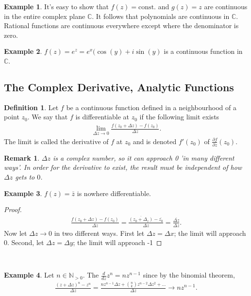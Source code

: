 \documentclass[12pt, a4paper]{article}
\theoremstyle{plain}
\newtheorem{rem}{Remark}
\theoremstyle{definition}
\newtheorem{definition}{Definition} %
\newtheorem{example}{Example} %
\begin{document}
			\begin{example}
				It's easy to show that $f(z)=\mathrm{const.}$ and $g(z)=z$ are continuous in the entire complex plane $\mathbb{C}$. It follows that polynomials are continuous in $\mathbb{C}$. Rational functions are continuous everywhere except where the denominator is zero.\\
			\end{example}

			\begin{example}
				$f(z) = e^z = e^x(\cos(y)+i\sin(y)$ is a continuous function in $\mathbb{C}$.\\
			\end{example}
		\subsection{The Complex Derivative, Analytic Functions} %
		\label{sub:the_complex_derivative_analytic_functions}
			\begin{definition}
				Let $f$ be a continuous function defined in a neighbourhood of a point $z_0$. We say that $f$ is differentiable at $z_0$ if the following limit exists
				\begin{align*}
					\lim\limits_{\Delta z\to 0}\frac{f(z_0+\Delta z)-f(z_0)}{\Delta z}.
				\end{align*}
				The limit is called the derivative of $f$ at $z_0$ and is denoted $f'(z_0)$ of $\frac{\partial f}{\partial z}(z_0)$.\\
			\end{definition}
			\begin{rem}
				$\Delta z$ is a complex number, so it can approach 0 'in many different ways'. In order for the derivative to exist, the result must be independent of how $\Delta z$ gets to $0$.\\
			\end{rem}
			\begin{example}
				$f(z) = \bar{z}$ is nowhere differentiable.
				\begin{proof}
					\begin{align*}
						\frac{f(z_0+\Delta z)-f(z_0)}{\Delta z} = 
						\frac{\overline{(z_0+\Delta_z)}-\overline{z_0}}{\Delta z} = 
						\frac{\overline{\Delta z}}{\Delta z}.
					\end{align*}
					Now let $\Delta z\to 0$ in two different ways. First let $\Delta z = \Delta x$; the limit will approach 0. Second, let $\Delta z = \Delta y$; the limit will approach -1
				\end{proof}
			\end{example}
			~\\
			\begin{example}
				Let $n\in \mathbb{N}_{>0}$. The $\frac{d}{dz}z^n = nz^{n-1}$ since by the binomial theorem,
				\begin{align*}
					\frac{(z+\Delta z)^n-z^n}{\Delta z} = \frac{nz^{n-1}\Delta z + \binom{n}{k}z^{n-2}\Delta z^2 + \ldots}{\Delta z}\to nz^{n-1}.\\
				\end{align*}
			\end{example}
\end{document}
